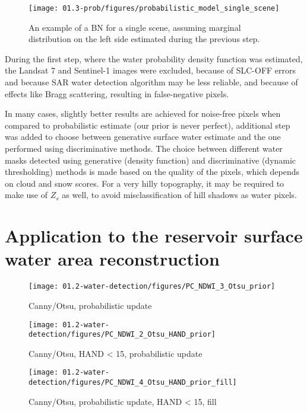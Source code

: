 \begin{figure}[H]
	\centering
	\texttt{[image: 01.3-prob/figures/probabilistic\_model\_single\_scene]}
	\caption{An example of a BN for a single scene, assuming marginal distribution on the left side estimated during the previous step.}
	\label{fig:prob-diagram}
\end{figure}

During the first step, where the water probability density function was estimated, the Landsat 7 and Sentinel-1 images were excluded, because of SLC-OFF errors and because SAR water detection algorithm may be less reliable, and because of effects like Bragg scattering, resulting in false-negative pixels.

In many cases, slightly better results are achieved for noise-free pixels when compared to probabilistic estimate (our prior is never perfect), additional step was added to choose between generative surface water estimate and the one performed using discriminative methods. The choice between different water masks detected using generative (density function) and discriminative (dynamic thresholding) methods is made based on the quality of the pixels, which depends on cloud and snow scores. For a very hilly topography, it may be required to make use of $Z_s$ as well, to avoid misclassification of hill shadows as water pixels.

\section{Application to the reservoir surface water area reconstruction}

\begin{figure}
	\centering
	\texttt{[image: 01.2-water-detection/figures/PC\_NDWI\_3\_Otsu\_prior]}
	\caption{Canny/Otsu, probabilistic update}
	\label{fig:r1_canny_otsu_nb}
\end{figure}

\begin{figure}
	\centering
	\texttt{[image: 01.2-water-detection/figures/PC\_NDWI\_2\_Otsu\_HAND\_prior]}
	\caption{Canny/Otsu, HAND < 15, probabilistic update}
	\label{fig:r1_canny_otsu_hand_nb}
\end{figure}

\begin{figure}
	\centering
	\texttt{[image: 01.2-water-detection/figures/PC\_NDWI\_4\_Otsu\_HAND\_prior\_fill]}
	\caption{Canny/Otsu, probabilistic update, HAND < 15, fill}
	\label{fig:r1_canny_otsu_hand_nb_fill}
\end{figure}

